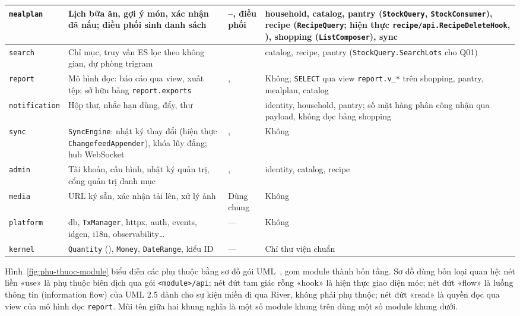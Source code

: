 {\begin{longtable}{|L{2.4cm}|L{\dimexpr{}\arrayrulewidth-2.4cm-1.9cm-4.5cm\relax}|L{1.9cm}|L{4.5cm}|}
\texttt{mealplan} & Lịch bữa ăn, gợi ý món, xác nhận đã nấu; điều phối sinh danh sách & --, điều phối  & household, catalog, pantry (\texttt{StockQuery}, \texttt{StockConsumer}), recipe (\texttt{RecipeQuery}; hiện thực \texttt{recipe/api.\allowbreak RecipeDeleteHook}, ), shopping (\texttt{ListComposer}), sync\\ \hline
\texttt{search} & Chỉ mục, truy vấn ES lọc theo không gian, dự phòng trigram &  & catalog, recipe, pantry (\texttt{StockQuery.\allowbreak SearchLots} cho Q01)\\ \hline
\texttt{report} & Mô hình đọc: báo cáo qua view, xuất tệp; sở hữu bảng \texttt{report.exports} & ,  & Không; \texttt{SELECT} qua view \texttt{report.v\_*} trên shopping, pantry, mealplan, catalog\\ \hline
\texttt{notification} & Hộp thư, nhắc hạn dùng, đẩy, thư &  & identity, household, pantry; số mặt hàng phân công nhận qua payload, không đọc bảng shopping\\ \hline
\texttt{sync} & \texttt{SyncEngine}: nhật ký thay đổi (hiện thực \texttt{ChangefeedAppender}), khóa lũy đẳng; hub WebSocket & ,  & Không\\ \hline
\texttt{admin} & Tài khoản, cấu hình, nhật ký quản trị, cổng quản trị danh mục & ,  & identity, catalog, recipe\\ \hline
\texttt{media} & URL ký sẵn, xác nhận tải lên, xử lý ảnh & Dùng chung & Không\\ \hline
\texttt{platform} & db, \texttt{TxManager}, httpx, auth, events, idgen, i18n, observability\ldots & — & Không\\ \hline
\texttt{kernel} & \texttt{Quantity} (), \texttt{Money}, \texttt{DateRange}, kiểu ID & — & Chỉ thư viện chuẩn\\ \hline
\end{longtable}
}

Hình~\ref{fig:phu-thuoc-module} biểu diễn các phụ thuộc bằng sơ đồ gói UML~\cite{uml251}, gom module thành bốn tầng. Sơ đồ dùng bốn loại quan hệ: nét liền «use» là phụ thuộc biên dịch qua gói \texttt{<module>/api}; nét đứt tam giác rỗng «hook» là hiện thực giao diện móc; nét đứt «flow» là luồng thông tin (information flow) của UML 2.5 dành cho sự kiện miền đi qua River, không phải phụ thuộc; nét đứt «read» là quyền đọc qua view của mô hình đọc \texttt{report}. Mũi tên giữa hai khung nghĩa là một số module khung trên dùng một số module khung dưới.

